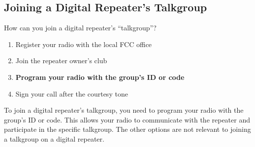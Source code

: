 \subsection{Joining a Digital Repeater’s Talkgroup}
\label{T2B07}

\begin{tcolorbox}[colback=gray!10!white,colframe=black!75!black,title=T2B07]
How can you join a digital repeater’s “talkgroup”?
\begin{enumerate}[noitemsep]
    \item Register your radio with the local FCC office
    \item Join the repeater owner’s club
    \item \textbf{Program your radio with the group’s ID or code}
    \item Sign your call after the courtesy tone
\end{enumerate}
\end{tcolorbox}

To join a digital repeater’s talkgroup, you need to program your radio with the group’s ID or code. This allows your radio to communicate with the repeater and participate in the specific talkgroup. The other options are not relevant to joining a talkgroup on a digital repeater.